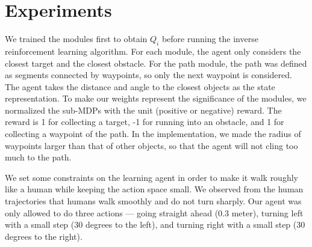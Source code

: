 \section{Experiments}
\label{sec:exp}

We trained the modules first to obtain $Q_i$ before running the inverse
reinforcement learning algorithm. For each module, the agent only considers the
closest target and the closest obstacle. For the path module, the path was
defined as segments connected by waypoints, so only the next waypoint is
considered. The agent takes the distance and angle to the closest objects as the
state representation. To make our weights represent the significance of the
modules, we normalized the sub-MDPs with the unit (positive or negative) reward.
The reward is 1 for collecting a target, -1 for running into an obstacle, and 1
for collecting a waypoint of the path. In the implementation, we made the radius
of waypoints larger than that of other objects, so that the agent will not cling
too much to the path.

We set some constraints on the learning agent in order to make it walk roughly
like a human while keeping the action space small.  We observed from the human
trajectories that humans walk smoothly and do not turn sharply.  Our agent was
only allowed to do three actions --- going straight ahead (0.3 meter),
turning left with a small step (30 degrees to the left), and turning right with
a small step (30 degrees to the right).

